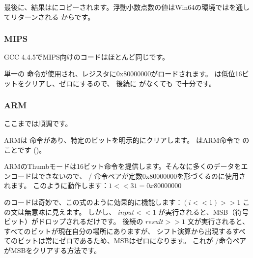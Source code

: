最後に、結果はにコピーされます。浮動小数点数の値はWin64の環境ではを通してリターンされる
からです。

\subsubsection{MIPS}

GCC 4.4.5でMIPS向けのコードはほとんど同じです。




単一の \LUI 命令が使用され、レジスタに0x80000000がロードされます。
\LUI は低位16ビットをクリアし、ゼロにするので、 後続に \ORI がなくても \LUI で十分です。

\subsubsection{ARM}

\myparagraph{\OptimizingKeilVI (\ARMMode)}



ここまでは順調です。

ARMは \BIC 命令があり、特定のビットを明示的にクリアします。
\EOR はARM命令で \XOR のことです
()。

\myparagraph{\OptimizingKeilVI (\ThumbMode)}



ARMのThumbモードは16ビット命令を提供します。そんなに多くのデータをエンコードはできないので、
/ 命令ペアが定数0x80000000を形づくるのに使用されます。
このように動作します：$1<<31 = 0x80000000$


のコードは奇妙で、この式のように効果的に機能します：$(i<<1)>>1$
この文は無意味に見えます。 しかし、 $input<<1$ が実行されると、\ac{MSB}（符号ビット）がドロップされるだけです。
後続の $result>>1$ 文が実行されると、すべてのビットが現在自分の場所にありますが、
シフト演算から出現するすべてのビットは常にゼロであるため、\ac{MSB}はゼロになります。 
これが \LSLS/\LSRS 命令ペアが\ac{MSB}をクリアする方法です。

